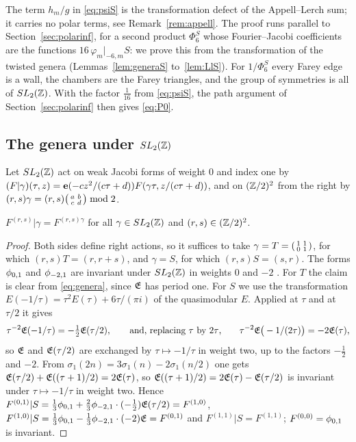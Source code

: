 The term $h_m/g$ in \eqref{eq:psiS} is the transformation defect of the Appell--Lerch sum; it carries no polar terms, see Remark~\ref{rem:appell}. The proof runs parallel to Section~\ref{sec:polarinf}, for a second product $\Phi^S_6$ whose Fourier--Jacobi coefficients are the functions $16\,\varphi_m|_{-6,m}S$: we prove this from the transformation of the twisted genera (Lemmas~\ref{lem:generaS} to~\ref{lem:LlS}). For $1/\Phi^S_6$ every Farey edge is a wall, the chambers are the Farey triangles, and the group of symmetries is all of $SL_2(\mathbb{Z})$. With the factor $\frac1{16}$ from \eqref{eq:psiS}, the path argument of Section~\ref{sec:polarinf} then gives \eqref{eq:P0}.

\subsection{The genera under \texorpdfstring{$SL_2(\mathbb{Z})$}{SL2(Z)}}
Let $SL_2(\mathbb{Z})$ act on weak Jacobi forms of weight $0$ and index one by $(F|\gamma)(\tau,z)=\mathbf e(-cz^2/(c\tau+d))F(\gamma\tau,z/(c\tau+d))$, and on $(\mathbb{Z}/2)^2$ from the right by $(r,s)\gamma=(r,s)\begin{psmallmatrix}a&b\\c&d\end{psmallmatrix}\bmod2$.

\begin{lemma}\label{lem:generaS}
$F^{(r,s)}|\gamma=F^{(r,s)\gamma}$ for all $\gamma\in SL_2(\mathbb{Z})$ and $(r,s)\in(\mathbb{Z}/2)^2$.
\end{lemma}

\begin{proof}
Both sides define right actions, so it suffices to take $\gamma=T=\begin{psmallmatrix}1&1\\0&1\end{psmallmatrix}$, for which $(r,s)T=(r,r+s)$, and $\gamma=S$, for which $(r,s)S=(s,r)$. The forms $\phi_{0,1}$ and $\phi_{-2,1}$ are invariant under $SL_2(\mathbb{Z})$ in weights $0$ and $-2$ \cite[\S9]{EZ85}. For $T$ the claim is clear from \eqref{eq:genera}, since $\mathfrak E$ has period one. For $S$ we use the transformation $E(-1/\tau)=\tau^2E(\tau)+6\tau/(\pi i)$ of the quasimodular $E$. Applied at $\tau$ and at $\tau/2$ it gives
\[
\tau^{-2}\mathfrak E(-1/\tau)=-\tfrac12\mathfrak E(\tau/2),\qquad\text{and, replacing $\tau$ by $2\tau$,}\qquad \tau^{-2}\mathfrak E\big(-1/(2\tau)\big)=-2\mathfrak E(\tau),
\]
so $\mathfrak E$ and $\mathfrak E(\tau/2)$ are exchanged by $\tau\mapsto-1/\tau$ in weight two, up to the factors $-\frac12$ and $-2$.
From $\sigma_1(2n)=3\sigma_1(n)-2\sigma_1(n/2)$ one gets $\mathfrak E(\tau/2)+\mathfrak E((\tau+1)/2)=2\mathfrak E(\tau)$, so $\mathfrak E((\tau+1)/2)=2\mathfrak E(\tau)-\mathfrak E(\tau/2)$ is invariant under $\tau\mapsto-1/\tau$ in weight two. Hence $F^{(0,1)}|S=\frac13\phi_{0,1}+\frac23\phi_{-2,1}\cdot(-\frac12)\mathfrak E(\tau/2)=F^{(1,0)}$, $F^{(1,0)}|S=\frac13\phi_{0,1}-\frac13\phi_{-2,1}\cdot(-2)\mathfrak E=F^{(0,1)}$ and $F^{(1,1)}|S=F^{(1,1)}$; $F^{(0,0)}=\phi_{0,1}$ is invariant.
\end{proof}


